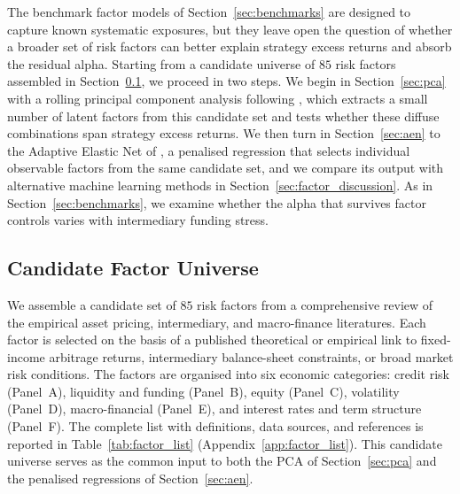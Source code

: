 


The benchmark factor models of Section~\ref{sec:benchmarks} are
designed to capture known systematic exposures, but they leave open
the question of whether a broader set of risk factors can better
explain strategy excess returns and absorb the residual alpha.
Starting from a candidate universe of $85$ risk factors assembled
in Section~\ref{sec:factor_universe}, we proceed in two steps. We begin in
Section~\ref{sec:pca} with a rolling principal component analysis
following \citet{ludvigson2009macro}, which extracts a small number of
latent factors from this candidate set and tests whether these diffuse
combinations span strategy excess returns. We then
turn in Section~\ref{sec:aen} to the Adaptive Elastic Net of
\citet{zou2009adaptive}, a penalised regression that selects
individual observable factors from the same candidate set, and we
compare its output with alternative machine learning methods in
Section~\ref{sec:factor_discussion}. As in
Section~\ref{sec:benchmarks}, we examine whether the alpha that
survives factor controls varies with intermediary funding stress.



\subsection{Candidate Factor Universe}
\label{sec:factor_universe}

We assemble a candidate set of $85$ risk factors from a comprehensive
review of the empirical asset pricing, intermediary, and macro-finance
literatures. Each factor is selected on the basis of a published
theoretical or empirical link to fixed-income arbitrage returns,
intermediary balance-sheet constraints, or broad market risk conditions.
The factors are organised into six economic categories: credit risk
(Panel~A), liquidity and funding (Panel~B), equity (Panel~C),
volatility (Panel~D), macro-financial (Panel~E), and interest rates
and term structure (Panel~F). The complete list with definitions,
data sources, and references is reported in Table~\ref{tab:factor_list}
(Appendix~\ref{app:factor_list}). This candidate universe serves as
the common input to both the PCA of Section~\ref{sec:pca} and the
penalised regressions of Section~\ref{sec:aen}.

